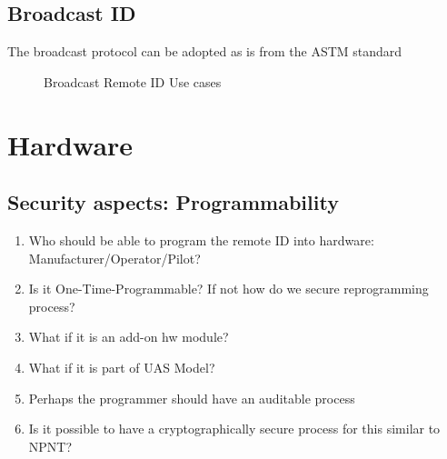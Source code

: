 \documentclass{ua_wgs_base}
\begin{document}
\subsection{Broadcast ID}

The broadcast protocol can be adopted as is from the ASTM standard

\begin{figure}[tbh]
\begin{centering}
\par\end{centering}
\caption{Broadcast Remote ID Use cases}
\end{figure}


\section{Hardware}

\subsection{Security aspects: Programmability}
\begin{enumerate}
\item Who should be able to program the remote ID into hardware: Manufacturer/Operator/Pilot?
\item Is it One-Time-Programmable? If not how do we secure reprogramming
process?
\item What if it is an add-on hw module?
\item What if it is part of UAS Model?
\item Perhaps the programmer should have an auditable process
\item Is it possible to have a cryptographically secure process for this
similar to NPNT?
\end{enumerate}
\end{document}
